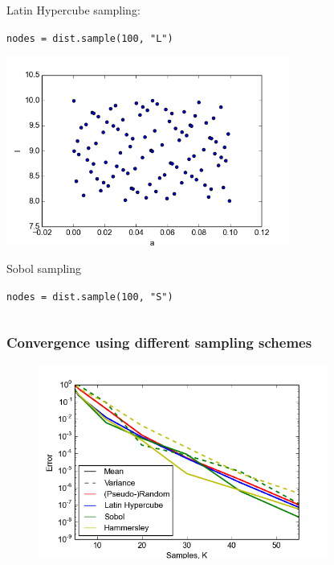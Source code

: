 \documentclass{beamer}
\begin{document}
\begin{frame}[fragile]
\begin{columns}
\begin{center}
                Latin Hypercube sampling:

                \scriptsize
                \verb;nodes = dist.sample(100, "L");
                \normalsize



                \includegraphics[width=0.7\textwidth]{samples_S.png}

                Sobol sampling

                \scriptsize
                \verb;nodes = dist.sample(100, "S");
                \normalsize
     \end{center}
 \end{columns}
\end{frame}


\begin{frame}
 \frametitle{Convergence using different sampling schemes}
  \begin{figure}
  \includegraphics[width=0.85\textwidth]{convergence_collocation_compare.png}
 \end{figure}
\end{frame}
\end{document}
